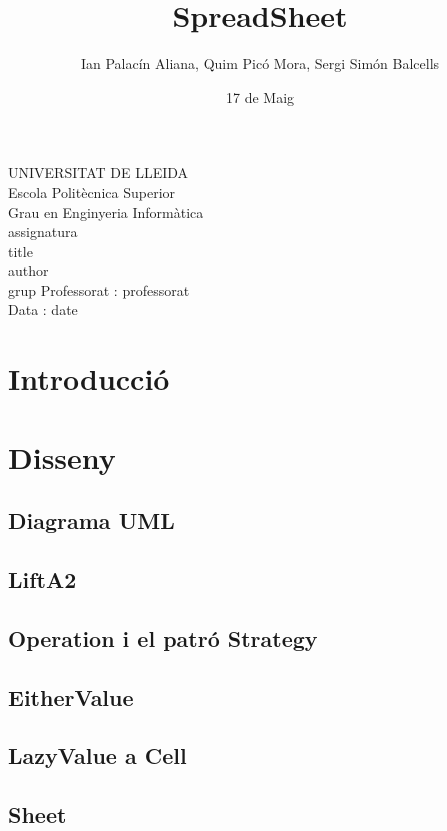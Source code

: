 \documentclass{article}
\title{SpreadSheet}
\author{Ian Palacín Aliana, Quim Picó Mora, Sergi Simón Balcells}
\date{17 de Maig}
\renewcommand{\maketitle}{ %
	\begin{titlepage}
		\raggedright{UNIVERSITAT DE LLEIDA \\
			Escola Politècnica Superior \\
			Grau en Enginyeria Informàtica\\
			\1assignatura\\}
		\vspace{5cm}
		\centering\huge{\5title \\}
		\vspace{3cm}
		\large{\6author} \\
		\normalsize{\3grup}
		\vfill
		Professorat : \4professorat \\
		Data : \7date
\end{titlepage}}
\begin{document}
	\maketitle
	\newpage
	\section{Introducció}
	\section{Disseny}
	\subsection{Diagrama UML}
	\subsection{LiftA2}
	 
	\subsection{Operation i el patró Strategy}
	
	\subsection{EitherValue}
	
	\subsection{LazyValue a Cell}
	\subsection{Sheet}
\end{document}
